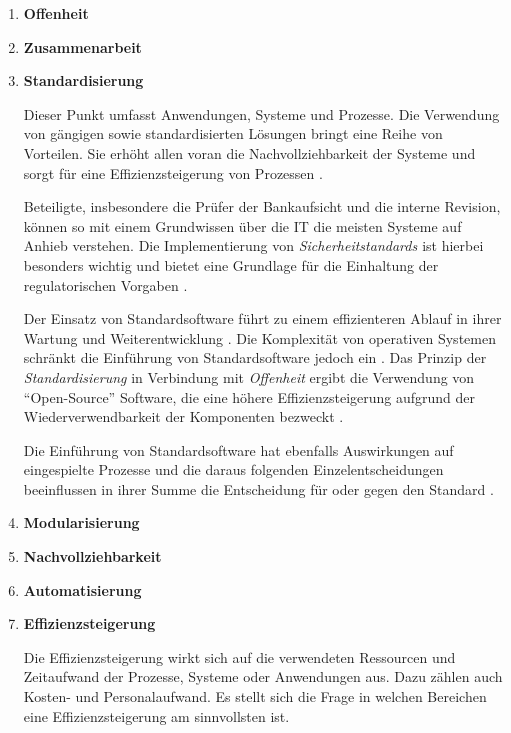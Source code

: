 \begin{enumerate}
    \item \textbf{Offenheit \cite{Brockhoff2006}}
    
    \item \textbf{Zusammenarbeit}

    \item \textbf{Standardisierung} 
    
    Dieser Punkt umfasst Anwendungen, Systeme und Prozesse. Die Verwendung von gängigen sowie standardisierten Lösungen bringt eine Reihe von Vorteilen. Sie erhöht allen voran die Nachvollziehbarkeit der Systeme und sorgt für eine Effizienzsteigerung von Prozessen \cite{Strietzel2018, Bussmann2006, Alt2017}. 
    
    Beteiligte, insbesondere die Prüfer der Bankaufsicht und die interne Revision, können so mit einem Grundwissen über die IT die meisten Systeme auf Anhieb verstehen. Die Implementierung von \emph{Sicherheitstandards \cite{IT-Grundschutz:2020, Disterer2013}} ist hierbei besonders wichtig und bietet eine Grundlage für die Einhaltung der regulatorischen Vorgaben \cite{MaRisk:2017, BAIT:2018}.
    
    Der Einsatz von Standardsoftware führt zu einem effizienteren Ablauf in ihrer Wartung und Weiterentwicklung \cite{Bussmann2006}. Die Komplexität von operativen Systemen schränkt die Einführung von Standardsoftware jedoch ein \cite[S.27]{Bussmann2006}. Das Prinzip der \emph{Standardisierung} in Verbindung mit \emph{Offenheit} ergibt die Verwendung von \enquote{Open-Source} Software, die eine höhere Effizienzsteigerung aufgrund der Wiederverwendbarkeit der Komponenten bezweckt \cite{Brockhoff2006, Gupta:2017}. 
    
    Die Einführung von Standardsoftware hat ebenfalls Auswirkungen auf eingespielte Prozesse und die daraus folgenden Einzelentscheidungen beeinflussen in ihrer Summe die Entscheidung für oder gegen den Standard \cite[Tab.1]{Manz2018}.
    
    \item \textbf{Modularisierung}
    
    \item \textbf{Nachvollziehbarkeit}
    
    \item \textbf{Automatisierung}
    
    \item \textbf{Effizienzsteigerung}
    
    Die Effizienzsteigerung wirkt sich auf die verwendeten Ressourcen und Zeitaufwand der Prozesse, Systeme oder Anwendungen aus. Dazu zählen auch Kosten- und Personalaufwand. Es stellt sich die Frage in welchen Bereichen eine Effizienzsteigerung am sinnvollsten ist.
    

\end{enumerate}
